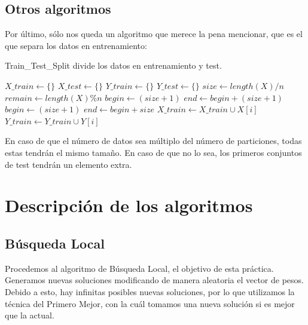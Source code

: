 \documentclass[11pt,a4paper]{article}
\begin{document}
\subsection{Otros algoritmos}

Por último, sólo nos queda un algoritmo que merece la pena mencionar, que es el que separa los datos en entrenamiento: \\
\begin{algorithm}[H]
	\caption{{\sc Train\_Test\_Split} divide los datos en entrenamiento y test.}
	
	$X\_train \gets \{\}$ \;
	$X\_test \gets \{\}$ \;
	$Y\_train \gets \{\}$ \;
	$Y\_test \gets \{\}$ \;
	$size \gets length(X) / n$ \;
	$remain \gets length(X) \% n$ \;
	 {
		$begin \gets (size + 1)$ \;
		$end \gets begin + (size + 1)$ \;
	}  {
		$begin \gets (size + 1)$ \;
		$end \gets begin + size$ \;
	} 
	 {
		 {
			$X\_train \gets X\_train \cup X[i]$ \;
			$Y\_train \gets Y\_train \cup Y[i]$ \;
		} 
	}
	 \;
	 \;
	 \;
	 \;
\end{algorithm}

En caso de que el número de datos sea múltiplo del número de particiones, todas estas tendrán el mismo tamaño. En caso de que no lo sea, los primeros conjuntos de test tendrán un elemento extra.

\newpage
\section{Descripción de los algoritmos}

\subsection{Búsqueda Local}

Procedemos al algoritmo de Búsqueda Local, el objetivo de esta práctica. Generamos nuevas soluciones modificando de manera aleatoria el vector de pesos. Debido a esto, hay infinitas posibles nuevas soluciones, por lo que utilizamos la técnica del Primero Mejor, con la cuál tomamos una nueva solución si es mejor que la actual.
\end{document}
